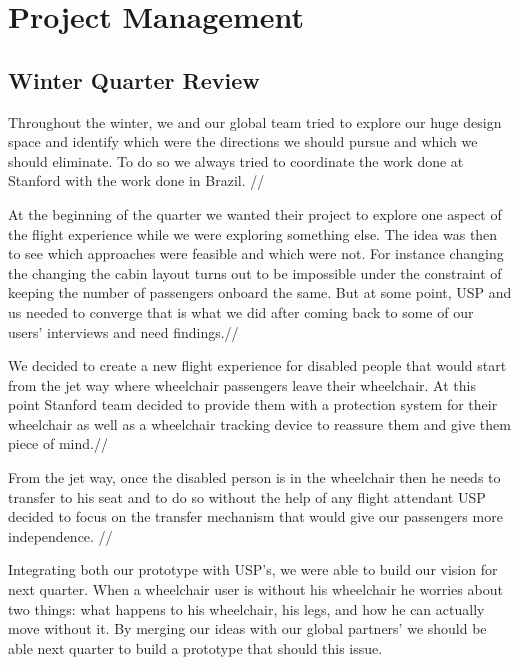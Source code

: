 \chapter{Project Management}
\label{Project_Management}

\section{Winter Quarter Review}
Throughout the winter, we and our global team tried to explore our huge design space and identify which were the directions we should pursue and which we should eliminate. To do so we always tried to coordinate the work done at Stanford with the work done in Brazil. //

At the beginning of the quarter we wanted their project to explore one aspect of the flight experience while we were exploring something else. The idea was then to see which approaches were feasible and which were not. For instance changing the changing the cabin layout turns out to be impossible under the constraint of keeping the number of passengers onboard the same. But at some point, USP and us needed to converge that is what we did after coming back to some of our users’ interviews and need findings.//

We decided to create a new flight experience for disabled people that would start from the jet way where wheelchair passengers leave their wheelchair. At this point Stanford team decided to provide them with a protection system for their wheelchair as well as a wheelchair tracking device to reassure them and give them piece of mind.// 

From the jet way, once the disabled person is in the wheelchair then he needs to transfer to his seat and to do so without the help of any flight attendant USP decided to focus on the transfer mechanism that would give our passengers more independence. //

Integrating both our prototype with USP’s, we were able to build our vision for next quarter. When a wheelchair user is without his wheelchair he worries about two things: what happens to his wheelchair, his legs, and how he can actually move without it. By merging our ideas with our global partners’ we should be able next quarter to build a prototype that should this issue.


